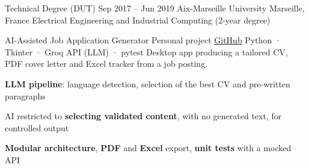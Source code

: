 \documentclass[10pt]{article}
\begin{document}
\begin{cvmain}
\begin{cvtimeline}
\cvsep
\cveducation
  {Technical Degree (DUT)}
  {Sep 2017 -- Jun 2019}
  {Aix-Marseille University}
  {Marseille, France}
  {Electrical Engineering and Industrial Computing (2-year degree)}

\end{cvtimeline}

\begin{cvtimeline}

\cvproject
  {AI-Assisted Job Application Generator}
  {Personal project}
  {\href{https://github.com/thomas-fuzellier/AI-Job-Application-Optimizer}{GitHub}}
  {Python · Tkinter · Groq API (LLM) · pytest}
  {Desktop app producing a tailored CV, PDF cover letter and Excel tracker from a job posting.}
\begin{cvitems}
  \item \textbf{LLM pipeline}: language detection, selection of the best CV and pre-written paragraphs
  \item AI restricted to \textbf{selecting validated content}, with no generated text, for controlled output
  \item \textbf{Modular architecture}, \textbf{PDF} and \textbf{Excel} export, \textbf{unit tests} with a mocked API
\end{cvitems}

\end{cvtimeline}

\end{cvmain}
\end{document}
